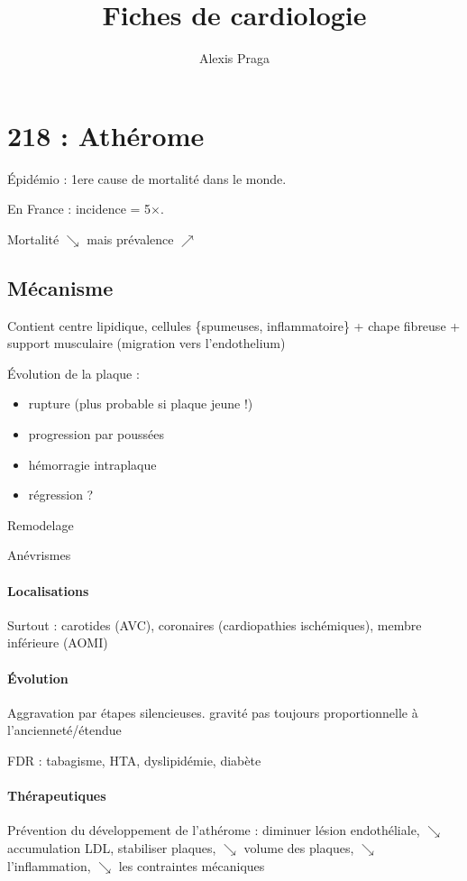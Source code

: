 \documentclass{article}
\begin{document}
\title{Fiches de cardiologie}
\author{Alexis Praga}
\maketitle
\tableofcontents



\section{218 : Athérome}%
\label{sec:1_atherome}

Épidémio : 1ere cause de mortalité dans le monde. 

En France : incidence \male = 5$\times$\female. 

Mortalité $\searrow$ mais prévalence $\nearrow$

\subsection{Mécanisme}
Contient centre lipidique, cellules \{spumeuses, inflammatoire\} +
chape fibreuse + support musculaire (migration vers l'endothelium)

Évolution de la plaque :
\begin{itemize}
  \item rupture (plus probable si plaque jeune !)
  \item progression par poussées
  \item hémorragie intraplaque
  \item régression ?
\end{itemize}
Remodelage

Anévrismes

\paragraph{Localisations}
Surtout : carotides (AVC), coronaires (cardiopathies ischémiques), membre inférieure
(AOMI)

\paragraph{Évolution} Aggravation par étapes silencieuses. \danger gravité pas
toujours proportionnelle à l'ancienneté/étendue

FDR : tabagisme, HTA, dyslipidémie, diabète

\paragraph{Thérapeutiques}
Prévention du développement de l'athérome : diminuer lésion endothéliale,
$\searrow$ accumulation LDL, stabiliser plaques, $\searrow$ volume des plaques,
$\searrow$ l'inflammation, $\searrow$ les contraintes mécaniques
\end{document}
